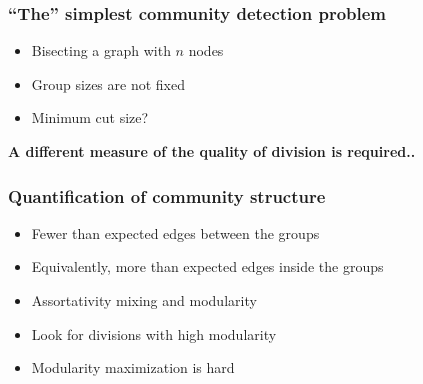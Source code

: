 \documentclass{beamer}
\begin{document}
\begin{frame}
    \frametitle{``The'' simplest community detection problem}
    \centering
    \begin{itemize}
    \setlength\itemsep{1em}
        \item{Bisecting a graph with $n$ nodes}
        \item{Group sizes are not fixed}
        \item{Minimum cut size?}
    \end{itemize}

    \vspace{2em}
    \pause
    {\bf A different measure of the quality of division is required..}
\end{frame}
\begin{frame}
    \frametitle{Quantification of community structure}
    \centering

    \begin{itemize}
        \setlength\itemsep{1em}
        \item{Fewer than expected edges between the groups}
            \pause
        \item{Equivalently, more than expected edges inside the groups}
            \pause
        \item{Assortativity mixing and modularity}
            \pause
        \item{Look for divisions with high modularity}
            \pause
        \item{Modularity maximization is hard}
    \end{itemize}

\end{frame}
\end{document}
